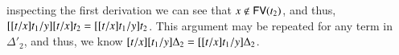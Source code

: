 \begin{report}
\begin{itemize}
inspecting the first derivation we can see that $ \mathit{x}  \not\in \mathsf{FV}(  \mathit{t_{{\mathrm{2}}}}  ) $,
and thus, $[  [  \mathit{t}  /  \mathit{x}  ]  \mathit{t_{{\mathrm{1}}}}  /  \mathit{y}  ]  [  \mathit{t}  /  \mathit{x}  ]  \mathit{t_{{\mathrm{2}}}}  =  [  [  \mathit{t}  /  \mathit{x}  ]  \mathit{t_{{\mathrm{1}}}}  /  \mathit{y}  ]  \mathit{t_{{\mathrm{2}}}}$.  This
argument may be repeated for any term in $\Delta'_{{\mathrm{2}}}$, and thus, we know
$[  \mathit{t}  /  \mathit{x}  ]  [  \mathit{t_{{\mathrm{1}}}}  /  \mathit{y}  ]  \Delta_{{\mathrm{2}}}  =  [  [  \mathit{t}  /  \mathit{x}  ]  \mathit{t_{{\mathrm{1}}}}  /  \mathit{y}  ]  \Delta_{{\mathrm{2}}}$.


\end{itemize}
\end{report}
